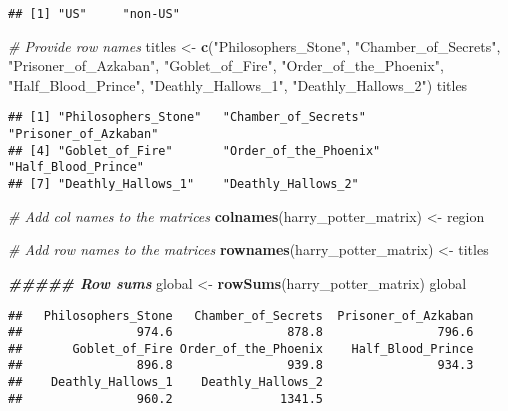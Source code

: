 \documentclass[
]{article}
\newenvironment{Shaded}{\begin{snugshade}}{\end{snugshade}}
\newcommand{\CommentTok}[1]{\textcolor[rgb]{0.56,0.35,0.01}{\textit{#1}}}
\newcommand{\DocumentationTok}[1]{\textcolor[rgb]{0.56,0.35,0.01}{\textbf{\textit{#1}}}}
\newcommand{\FunctionTok}[1]{\textcolor[rgb]{0.13,0.29,0.53}{\textbf{#1}}}
\newcommand{\NormalTok}[1]{#1}
\newcommand{\OtherTok}[1]{\textcolor[rgb]{0.56,0.35,0.01}{#1}}
\newcommand{\StringTok}[1]{\textcolor[rgb]{0.31,0.60,0.02}{#1}}
\begin{document}
\begin{verbatim}
## [1] "US"     "non-US"
\end{verbatim}

\begin{Shaded}
\begin{Highlighting}[]
\CommentTok{\# Provide row names}
\NormalTok{titles }\OtherTok{\textless{}{-}} \FunctionTok{c}\NormalTok{(}\StringTok{"Philosophers\_Stone"}\NormalTok{, }\StringTok{"Chamber\_of\_Secrets"}\NormalTok{, }\StringTok{"Prisoner\_of\_Azkaban"}\NormalTok{, }\StringTok{"Goblet\_of\_Fire"}\NormalTok{, }\StringTok{"Order\_of\_the\_Phoenix"}\NormalTok{, }\StringTok{"Half\_Blood\_Prince"}\NormalTok{, }\StringTok{"Deathly\_Hallows\_1"}\NormalTok{, }\StringTok{"Deathly\_Hallows\_2"}\NormalTok{)}
\NormalTok{titles}
\end{Highlighting}
\end{Shaded}

\begin{verbatim}
## [1] "Philosophers_Stone"   "Chamber_of_Secrets"   "Prisoner_of_Azkaban" 
## [4] "Goblet_of_Fire"       "Order_of_the_Phoenix" "Half_Blood_Prince"   
## [7] "Deathly_Hallows_1"    "Deathly_Hallows_2"
\end{verbatim}

\begin{Shaded}
\begin{Highlighting}[]
\CommentTok{\# Add col names to the matrices}
\FunctionTok{colnames}\NormalTok{(harry\_potter\_matrix) }\OtherTok{\textless{}{-}}\NormalTok{ region}

\CommentTok{\# Add row names to the matrices}
\FunctionTok{rownames}\NormalTok{(harry\_potter\_matrix) }\OtherTok{\textless{}{-}}\NormalTok{ titles}



\DocumentationTok{\#\#\#\#\# Row sums}
\NormalTok{global }\OtherTok{\textless{}{-}} \FunctionTok{rowSums}\NormalTok{(harry\_potter\_matrix)}
\NormalTok{global}
\end{Highlighting}
\end{Shaded}

\begin{verbatim}
##   Philosophers_Stone   Chamber_of_Secrets  Prisoner_of_Azkaban 
##                974.6                878.8                796.6 
##       Goblet_of_Fire Order_of_the_Phoenix    Half_Blood_Prince 
##                896.8                939.8                934.3 
##    Deathly_Hallows_1    Deathly_Hallows_2 
##                960.2               1341.5
\end{verbatim}
\end{document}
